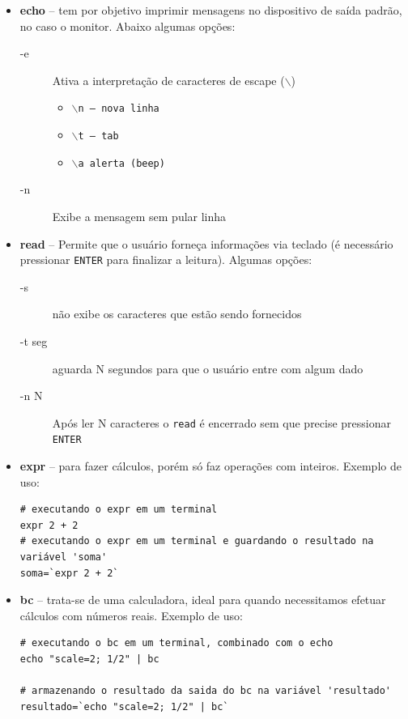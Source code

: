 \documentclass[11pt]{ifscarticle}
\begin{document}
\begin{itemize}
    \item \textbf{echo} -- tem por objetivo imprimir mensagens no dispositivo de saída padrão, no caso o monitor. Abaixo algumas opções:
    \begin{description}
        \item[-e] Ativa a interpretação de caracteres de escape (\texttt{$\backslash$})
        \begin{itemize}
            \item $\backslash$\texttt{n -- nova linha}
            \item $\backslash$\texttt{t -- tab}
            \item $\backslash$\texttt{a alerta (beep)}
        \end{itemize}
        \item[-n] Exibe a mensagem sem pular linha
    \end{description}
    \item \textbf{read} -- Permite que o usuário forneça informações via teclado (é necessário pressionar \texttt{ENTER} para finalizar a leitura). Algumas opções:
    \begin{description}
        \item[-s] não exibe os caracteres que estão sendo fornecidos
        \item[-t seg] aguarda N segundos para que o usuário entre com algum dado
        \item[-n N] Após ler N caracteres o \texttt{read} é encerrado sem que precise pressionar \texttt{ENTER} 
    \end{description}
    \item \textbf{expr} -- para fazer cálculos, porém só faz operações com inteiros. Exemplo de uso: 
\begin{lstlisting}[style=bash]
# executando o expr em um terminal
expr 2 + 2
# executando o expr em um terminal e guardando o resultado na variável 'soma'
soma=`expr 2 + 2`
\end{lstlisting}
    \item \textbf{bc} -- trata-se de uma calculadora, ideal para quando necessitamos efetuar cálculos com números reais. Exemplo de uso: 
\begin{lstlisting}[style=bash]
# executando o bc em um terminal, combinado com o echo
echo "scale=2; 1/2" | bc

# armazenando o resultado da saida do bc na variável 'resultado'
resultado=`echo "scale=2; 1/2" | bc`
\end{lstlisting}

\end{itemize}
\end{document}
